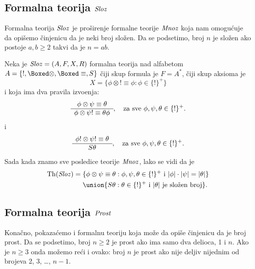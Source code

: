 \subsection{Formalna teorija $\mathit{Sloz}$}

Formalna teorija $\mathit{Sloz}$ je pro\v sirenje formalne teorije $\mathit{Mnoz}$ koja nam omogu\'cuje da opi\v semo \v cinjenicu da je neki
broj slo\v zen. Da se podsetimo, broj $n$ je slo\v zen ako postoje $a, b \ge 2$ takvi da je $n = ab$.

Neka je $\mathit{Sloz} = (A, F, X, R)$ formalna teorija nad alfabetom $A = \{!, \Boxed\otimes, \Boxed\equiv, S\}$ \v ciji skup formula je
$F = A^*$, \v ciji skup aksioma je
$$
  X = \{\phi \otimes ! \equiv \phi : \phi \in \{!\}^+\}
$$
i koja ima dva pravila izvo\dj enja:
$$
  \begin{array}{c}
    \phi \otimes \psi \equiv \theta \\ \hline
    \phi \otimes \psi! \equiv \theta\phi
  \end{array}, \text{\quad za sve } \phi, \psi, \theta \in \{!\}^+.
$$
i
$$
  \begin{array}{c}
    \phi! \otimes \psi! \equiv \theta \\ \hline
    S\theta
  \end{array}, \text{\quad za sve } \phi, \psi, \theta \in \{!\}^+.
$$
Sada kada znamo sve posledice teorije $\mathit{Mnoz}$, lako se vidi da je
\begin{align*}
  \Th(\Sloz) = \mathstrut
    &\{\phi \otimes \psi \equiv \theta : \phi, \psi, \theta \in \{!\}^+ \text{ i } |\phi| \cdot |\psi| = |\theta|\}\\
    &\mathstrut \union \{S\theta : \theta \in \{!\}^+ \text{ i } |\theta| \text{ je slo\v zen broj} \}.
\end{align*}

\subsection{Formalna teorija $\mathit{Prost}$}

Kona\v cno, pokaza\'cemo i formalnu teoriju koja mo\v ze da opi\v se \v cinjenicu da je broj prost.
Da se podsetimo, broj $n \ge 2$ je prost ako ima samo dva delioca, 1 i $n$. Ako je $n \ge 3$ onda mo\v zemo re\'ci i ovako:
broj $n$ je prost ako nije deljiv nijednim od brojeva 2, 3, \ldots,  $n - 1$.

